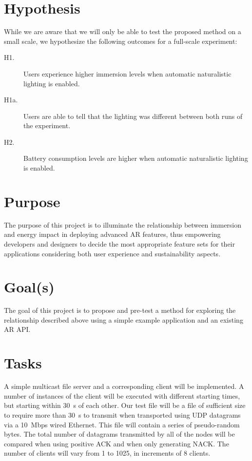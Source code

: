 \documentclass[12pt,twoside,english]{article}
\begin{document}
\section{Hypothesis}
\label{sect:hypothesis}

While we are aware that we will only be able to test the proposed method on a small scale, we hypothesize the following outcomes for a full-scale experiment:

\begin{description}
    \item[H1.] Users experience higher immersion levels when automatic naturalistic lighting is enabled.
    \item[H1a.] Users are able to tell that the lighting was different between both runs of the experiment.
    \item[H2.] Battery consumption levels are higher when automatic naturalistic lighting is enabled.
\end{description}

\section{Purpose}
\label{sect:purpose}

The purpose of this project is to illuminate the relationship between immersion and energy impact in deploying advanced \gls{AR} features, thus empowering developers and designers to decide the most appropriate feature sets for their applications considering both user experience and sustainability aspects.

\section{Goal(s)}
\label{sect:goals}

The goal of this project is to propose and pre-test a method for exploring the relationship described above using a simple example application and an existing \gls{AR} \gls{API}.

\section{Tasks}
\label{sect:tasks}

A simple multicast file server and a corresponding client will be implemented. A number of instances of the client will be executed with different starting times, but starting within \SI{30}{\second} of each other. Our test file will be a file of sufficient size to require more than \SI{30}{\second} to transmit when transported using UDP datagrams via a \SI{10}{Mbps} wired Ethernet. This file will contain a series of pseudo-random bytes. The total number of datagrams transmitted by all of the nodes will be compared when using positive ACK and when only generating NACK. The number of clients will vary from 1 to 1025, in increments of 8 clients.
\end{document}
